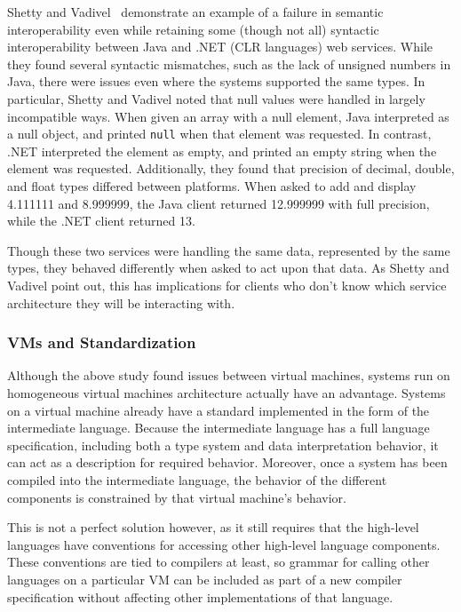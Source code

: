 \documentclass{sig-alternate}
\begin{document}
Shetty and Vadivel~\cite{Shetty:2009} demonstrate an example of a failure in semantic interoperability even while retaining some (though not all) syntactic interoperability between Java and .NET (CLR languages) web services.
While they found several syntactic mismatches, such as the lack of unsigned numbers in Java, there were issues even where the systems supported the same types. In particular, Shetty and Vadivel noted that null values were handled in largely incompatible ways. When given an array with a null element, Java interpreted as a null object, and printed {\tt null} when that element was requested. In contrast, .NET interpreted the element as empty, and printed an empty string when the element was requested. 
Additionally, they found that precision of decimal, double, and float types differed between platforms. When asked to add and display 4.111111 and 8.999999, the Java client returned 12.999999 with full precision, while the .NET client returned 13.

Though these two services were handling the same data, represented by the same types, they behaved differently when asked to act upon that data. As Shetty and Vadivel point out, this has implications for clients who don't know which service architecture they will be interacting with\cite{Shetty:2009}.


\subsubsection*{VMs and Standardization}
Although the above study found issues between virtual machines, systems run on homogeneous virtual machines architecture actually have an advantage. Systems on a virtual machine already have a standard implemented in the form of the intermediate language. Because the intermediate language has a full language specification, including both a type system and data interpretation behavior, it can act as a description for required behavior. Moreover, once a system has been compiled into the intermediate language, the behavior of the different components is constrained by that virtual machine's behavior.

This is not a perfect solution however, as it still requires that the high-level languages have conventions for accessing other high-level language components.
These conventions are tied to compilers at least, so grammar for calling other languages on a particular VM can be included as part of a new compiler specification without affecting other implementations of that language.
\end{document}
